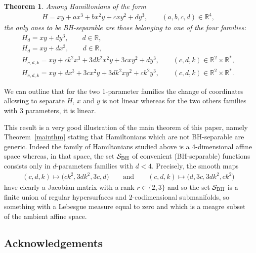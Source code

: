 \documentclass[10pt,a4paper]{amsart}
\numberwithin{equation}{section}
\newtheorem{Theorem}{Theorem}[section]
\begin{document}
\begin{Theorem}
	Among Hamiltonians of the form
\begin{gather*}
H=xy+ax^3+bx^2y+cxy^2+dy^3,\qquad (a,b,c,d)\in\mathbb{R}^4,
\end{gather*}
	the only ones to be BH-separable are those belonging to one of the four families:
\begin{gather*}	
H_d=xy+dy^3,\qquad d\in\mathbb{R},
\\	
H_d=xy+dx^3,\qquad d\in\mathbb{R},
\\	
H_{c,d,k}=xy+ck^2x^3+3dk^2x^2y+3cxy^2+dy^3,\qquad (c,d,k)\in\mathbb{R}^2\times\mathbb{R}^*,
\\	
H_{c,d,k}=xy+dx^3+3cx^2y+3dk^2xy^2+ck^2y^3,\qquad (c,d,k)\in\mathbb{R}^2\times\mathbb{R}^*.	
\end{gather*}
\end{Theorem}

\begin{Remark}
	We can outline that for the two $1$-parameter families the change of coordinates allowing to separate $H$, $x$ and $y$ is not linear whereas for the two others families with $3$ parameters, it is linear.
\end{Remark}

\begin{Remark}
	This result is a very good illustration of the main theorem of this paper, namely Theorem~\ref{mainthm} stating that Hamiltonians which are not BH-separable are generic. Indeed the family of Hamiltonians studied above is a $4$-dimensional affine space whereas, in that space, the set ${\cal S}_{\rm BH}$ of convenient (BH-separable) functions consists only in $d$-parameters families with $d<4$. Precisely, the smooth maps
\begin{gather*}
(c,d,k)\mapsto\big(ck^2,3dk^2,3c,d\big)\qquad \text{and}\qquad (c,d,k)\mapsto\big(d, 3c,3dk^2,ck^2\big)
\end{gather*}
	have clearly a Jacobian matrix with a rank $r\in\{2,3\}$ and so the set ${\cal S}_{\rm BH}$ is a finite union of regular hypersurfaces and $2$-codimensional submanifolds, so something with a Lebesgue measure equal to zero and which is a meagre subset of the ambient affine space.
	
\end{Remark}

\subsection*{Acknowledgements}
\end{document}

